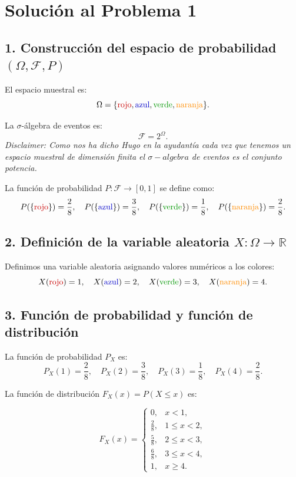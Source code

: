 \documentclass[a4paper,12pt]{article}
\begin{document}
\section*{Solución al Problema 1}

\subsection*{1. Construcción del espacio de probabilidad \((\Omega, \mathcal{F}, P)\)}

El espacio muestral es:
\[
\Omega = \{ \textcolor{rojo}{\text{rojo}}, \textcolor{azul}{\text{azul}}, \textcolor{verde}{\text{verde}}, \textcolor{naranja}{\text{naranja}} \}.
\]

La \(\sigma\)-álgebra de eventos es:
\[
\mathcal{F} = 2^\Omega.
\]
\textit{Disclaimer: Como nos ha dicho Hugo en la ayudantía cada vez que tenemos un espacio muestral de dimensión finita el $\sigma-algebra$ de eventos es el conjunto potencia.}


La función de probabilidad \(P: \mathcal{F} \to [0,1]\) se define como:
\[
P(\{\textcolor{rojo}{\text{rojo}}\}) = \frac{2}{8}, \quad
P(\{\textcolor{azul}{\text{azul}}\}) = \frac{3}{8}, \quad
P(\{\textcolor{verde}{\text{verde}}\}) = \frac{1}{8}, \quad
P(\{\textcolor{naranja}{\text{naranja}}\}) = \frac{2}{8}.
\]

\subsection*{2. Definición de la variable aleatoria \(X: \Omega \to \mathbb{R}\)}

Definimos una variable aleatoria asignando valores numéricos a los colores:
\[
X(\textcolor{rojo}{\text{rojo}}) = 1, \quad
X(\textcolor{azul}{\text{azul}}) = 2, \quad
X(\textcolor{verde}{\text{verde}}) = 3, \quad
X(\textcolor{naranja}{\text{naranja}}) = 4.
\]

\subsection*{3. Función de probabilidad y función de distribución}

La función de probabilidad \(P_X\) es:
\[
P_X(1) = \frac{2}{8}, \quad
P_X(2) = \frac{3}{8}, \quad
P_X(3) = \frac{1}{8}, \quad
P_X(4) = \frac{2}{8}.
\]

La función de distribución \(F_X(x) = P(X \leq x)\) es:

\[
F_X(x) =
\begin{cases}
0, & x < 1, \\
\frac{2}{8}, & 1 \leq x < 2, \\
\frac{5}{8}, & 2 \leq x < 3, \\
\frac{6}{8}, & 3 \leq x < 4, \\
1, & x \geq 4.
\end{cases}
\]
\end{document}
